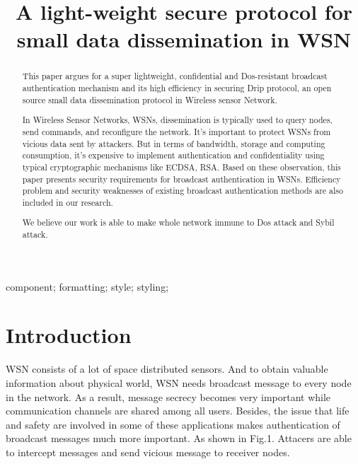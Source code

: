 \documentclass[10pt, conference, compsocconf]{IEEEtran}
\begin{document}
\title{A light-weight secure protocol for small data dissemination in WSN}

\author{
\and
{}
}

\maketitle


\begin{abstract}
This paper argues for a super lightweight, confidential and Dos-resistant broadcast authentication mechanism and its high efficiency in securing Drip protocol, an open source small data dissemination protocol in Wireless sensor Network. 

In Wireless Sensor Networks, WSNs, dissemination is typically used to query nodes, send commands, and reconfigure the network. It's important to protect WSNs from vicious data sent by attackers. But in terms of bandwidth, storage and computing consumption, it's  expensive to implement authentication and confidentiality using typical cryptographic mechanisms like ECDSA, RSA.  Based on these observation, this paper presents security requirements for broadcast authentication in WSNs. Efficiency problem and security weaknesses of existing broadcast authentication methods are also included in our research.

We believe our work is able to make whole network immune to Dos attack and Sybil attack. 

\end{abstract}

\begin{IEEEkeywords}
component; formatting; style; styling;

\end{IEEEkeywords}


\IEEEpeerreviewmaketitle



\section{Introduction}
WSN consists of a lot of space distributed sensors. And to obtain valuable information about physical world, WSN needs broadcast message to every node in the network. As a result, message secrecy becomes very important while communication channels are shared among all users. Besides, the issue that life and safety are involved in some of these applications makes authentication of broadcast messages much more important. As shown in Fig.1.  Attacers are able to intercept messages and send vicious message to receiver nodes.
\end{document}
